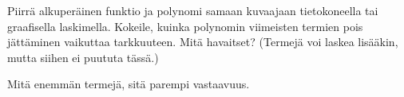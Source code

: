 \begin{tehtavasivu}
\begin{tehtava}
	Piirrä alkuperäinen funktio ja polynomi samaan kuvaajaan tietokoneella tai graafisella laskimella. Kokeile, kuinka polynomin viimeisten termien pois jättäminen vaikuttaa tarkkuuteen. Mitä havaitset? (Termejä voi laskea lisääkin, mutta siihen ei puututa tässä.)
	\begin{vastaus}
		Mitä enemmän termejä, sitä parempi vastaavuus.
	\end{vastaus}
\end{tehtava}

\end{tehtavasivu}